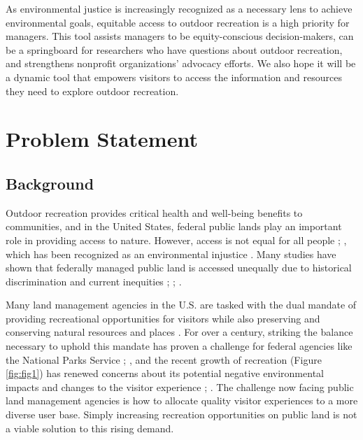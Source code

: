 \documentclass[
]{book}
\begin{document}
As environmental justice is increasingly recognized as a necessary lens to achieve environmental goals, equitable access to outdoor recreation is a high priority for managers. This tool assists managers to be equity-conscious decision-makers, can be a springboard for researchers who have questions about outdoor recreation, and strengthens nonprofit organizations' advocacy efforts. We also hope it will be a dynamic tool that empowers visitors to access the information and resources they need to explore outdoor recreation.

\hypertarget{problem-statement}{%
\chapter{Problem Statement}\label{problem-statement}}

\hypertarget{background}{%
\section{Background}\label{background}}

Outdoor recreation provides critical health and well-being benefits to communities, and in the United States, federal public lands play an important role in providing access to nature. However, access is not equal for all people \citep{Ewert1990}; \citep{Flores2018}, which has been recognized as an environmental injustice \citep{Floyd2002}. Many studies have shown that federally managed public land is accessed unequally due to historical discrimination and current inequities \citep{Floyd2002}; \citep{Shelby1989}; \citep{Xiao2021}.

Many land management agencies in the U.S. are tasked with the dual mandate of providing recreational opportunities for visitors while also preserving and conserving natural resources and places \citep{Shartaj2020}. For over a century, striking the balance necessary to uphold this mandate has proven a challenge for federal agencies like the National Parks Service \citep{Meinecke1937}; \citep{Sax1980}, and the recent growth of recreation (Figure \ref{fig:fig1}) has renewed concerns about its potential negative environmental impacts and changes to the visitor experience \citep{Hammitt2015}; \citep{Timmons2019}. The challenge now facing public land management agencies is how to allocate quality visitor experiences to a more diverse user base. Simply increasing recreation opportunities on public land is not a viable solution to this rising demand.
\end{document}
